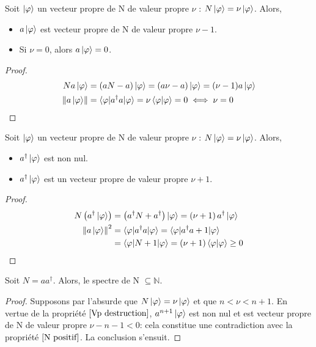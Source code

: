 \documentclass[../Notesdecours.tex]{subfiles}
\begin{document}
\begin{Property}
    \label{Vp destruction}
    Soit $\ket{\varphi}$ un vecteur propre de N de valeur propre $\nu$ : $N\ket{\varphi} = \nu\ket{\varphi}$. Alors,
    \begin{itemize}
        \item $a\ket{\varphi}$ est vecteur propre de N de valeur propre $\nu-1$.
        \item Si $\nu = 0$, alors $a\ket{\varphi} = 0$.
    \end{itemize}
\end{Property}
\begin{proof}
    \begin{align*}
        N a\ket{\varphi} &= (aN-a)\ket{\varphi} = (a\nu-a)\ket{\varphi} = (\nu-1)a\ket{\varphi}\\
        \norm{a\ket{\varphi}} &= \braket{\varphi|a^\dagger a|\varphi} = \nu \braket{\varphi|\varphi} = 0 \iff \nu = 0
    \end{align*}
\end{proof}
\begin{Property}
    Soit $\ket{\varphi}$ un vecteur propre de N de valeur propre $\nu$ : $N\ket{\varphi} = \nu\ket{\varphi}$. Alors,
    \begin{itemize}
        \item $a^\dagger\ket{\varphi}$ est non nul.
        \item $a^\dagger\ket{\varphi}$ est un vecteur propre de valeur propre $\nu+1$.
    \end{itemize}
\end{Property}
\begin{proof}
    \begin{align*}
        N \left(a^\dagger \ket{\varphi}\right) &= \left(a^\dagger N + a^\dagger\right)\ket{\varphi} = \left(\nu+1\right)a^\dagger\ket{\varphi}\\
        \norm{a\ket{\varphi}}^2 &= \braket{\varphi|a^\dagger a|\varphi} = \braket{\varphi|a^\dagger a+1|\varphi}\\
        &= \braket{\varphi|N+1|\varphi} = \left(\nu+1\right)\braket{\varphi|\varphi} \geq 0
    \end{align*}
\end{proof}

\begin{Property}
    Soit $N=aa^\dagger$. Alors, le spectre de N $\subseteq \mathbb{N}$.
\end{Property}
\begin{proof}
    Supposons par l'absurde que $N\ket{\varphi} = \nu\ket{\varphi}$ et que $n < \nu < n+1$. En vertue de la propriété $\ref{Vp destruction}$, $a^{n+1}\ket{\varphi}$ est non nul et est vecteur propre de N de valeur propre $\nu-n-1 < 0$: cela constitue une contradiction avec la propriété $\ref{N positif}$. La conclusion s'ensuit.
\end{proof}
\end{document}
